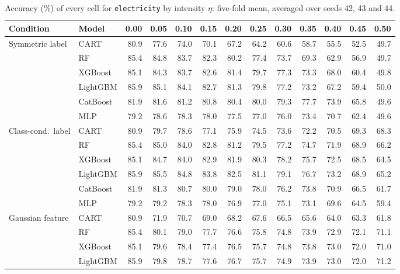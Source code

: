 \begin{table}[p]
\centering
\tiny
\setlength{\tabcolsep}{2.6pt}
\caption{Accuracy (\%) of every cell for \texttt{electricity} by intensity $\eta$: five-fold mean, averaged over seeds 42, 43 and 44.}
\label{tab:grid_electricity}
\begin{tabular}{@{}llrrrrrrrrrrr@{}}
\toprule
Condition & Model & 0.00 & 0.05 & 0.10 & 0.15 & 0.20 & 0.25 & 0.30 & 0.35 & 0.40 & 0.45 & 0.50 \\
\midrule
Symmetric label & CART & 80.9 & 77.6 & 74.0 & 70.1 & 67.2 & 64.2 & 60.6 & 58.7 & 55.5 & 52.5 & 49.7 \\
 & RF & 85.4 & 84.8 & 83.7 & 82.3 & 80.2 & 77.4 & 73.7 & 69.3 & 62.9 & 56.9 & 49.7 \\
 & XGBoost & 85.1 & 84.3 & 83.7 & 82.6 & 81.4 & 79.7 & 77.3 & 73.3 & 68.0 & 60.4 & 49.8 \\
 & LightGBM & 85.9 & 85.1 & 84.1 & 82.7 & 81.3 & 79.8 & 77.2 & 73.2 & 67.2 & 59.4 & 50.0 \\
 & CatBoost & 81.9 & 81.6 & 81.2 & 80.8 & 80.4 & 80.0 & 79.3 & 77.7 & 73.9 & 65.8 & 49.6 \\
 & MLP & 79.2 & 78.6 & 78.3 & 78.0 & 77.5 & 77.0 & 76.0 & 73.4 & 70.7 & 62.4 & 49.6 \\
\midrule
Class-cond.\ label & CART & 80.9 & 79.7 & 78.6 & 77.1 & 75.9 & 74.5 & 73.6 & 72.2 & 70.5 & 69.3 & 68.3 \\
 & RF & 85.4 & 85.0 & 84.0 & 82.8 & 81.2 & 79.5 & 77.2 & 74.7 & 71.9 & 68.9 & 66.2 \\
 & XGBoost & 85.1 & 84.7 & 84.0 & 82.9 & 81.9 & 80.3 & 78.2 & 75.7 & 72.5 & 68.5 & 64.5 \\
 & LightGBM & 85.9 & 85.5 & 84.8 & 83.8 & 82.5 & 81.1 & 79.1 & 76.7 & 73.2 & 68.9 & 65.2 \\
 & CatBoost & 81.9 & 81.3 & 80.7 & 80.0 & 79.0 & 78.0 & 76.2 & 73.8 & 70.9 & 66.5 & 61.7 \\
 & MLP & 79.2 & 79.2 & 78.3 & 78.0 & 76.9 & 77.0 & 75.1 & 73.1 & 69.6 & 64.5 & 59.4 \\
\midrule
Gaussian feature & CART & 80.9 & 71.9 & 70.7 & 69.0 & 68.2 & 67.6 & 66.5 & 65.6 & 64.0 & 63.3 & 61.8 \\
 & RF & 85.4 & 80.1 & 79.0 & 77.7 & 76.6 & 75.8 & 74.8 & 73.9 & 72.9 & 72.1 & 71.1 \\
 & XGBoost & 85.1 & 79.6 & 78.4 & 77.4 & 76.5 & 75.7 & 74.8 & 73.8 & 73.0 & 72.0 & 71.0 \\
 & LightGBM & 85.9 & 79.8 & 78.7 & 77.6 & 76.7 & 75.7 & 74.9 & 73.9 & 73.0 & 72.0 & 71.2 \\

\end{tabular}
\end{table}
